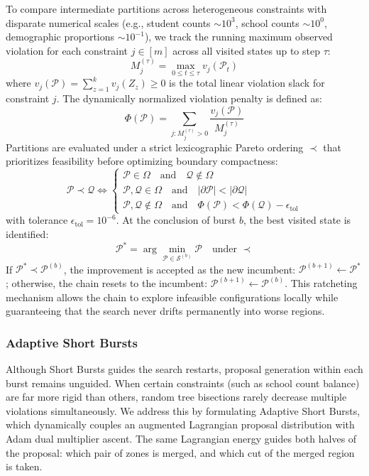 \documentclass{article}
\begin{document}
To compare intermediate partitions across heterogeneous constraints with disparate numerical scales (e.g., student counts $\sim 10^3$, school counts $\sim 10^0$, demographic proportions $\sim 10^{-1}$), we track the running maximum observed violation for each constraint $j \in [m]$ across all visited states up to step $\tau$:
\begin{equation}
M_j^{(\tau)} = \max_{0 \le t \le \tau} v_j(\mathcal{P}_t)
\end{equation}
where $v_j(\mathcal{P}) = \sum_{z=1}^k v_j(Z_z) \ge 0$ is the total linear violation slack for constraint $j$. The dynamically normalized violation penalty is defined as:
\begin{equation}
\Phi(\mathcal{P}) = \sum_{j: M_j^{(\tau)} > 0} \frac{v_j(\mathcal{P})}{M_j^{(\tau)}}
\end{equation}
Partitions are evaluated under a strict lexicographic Pareto ordering $\prec$ that prioritizes feasibility before optimizing boundary compactness:
\begin{equation}
\mathcal{P} \prec \mathcal{Q} \iff \begin{cases}
\mathcal{P} \in \Omega \quad \text{and} \quad \mathcal{Q} \notin \Omega \\
\mathcal{P}, \mathcal{Q} \in \Omega \quad \text{and} \quad |\partial \mathcal{P}| < |\partial \mathcal{Q}| \\
\mathcal{P}, \mathcal{Q} \notin \Omega \quad \text{and} \quad \Phi(\mathcal{P}) < \Phi(\mathcal{Q}) - \epsilon_{\text{tol}}
\end{cases}
\end{equation}
with tolerance $\epsilon_{\text{tol}} = 10^{-6}$. At the conclusion of burst $b$, the best visited state is identified:
\begin{equation}
\mathcal{P}^* = \arg\min_{\mathcal{P} \in \mathcal{S}^{(b)}} \mathcal{P} \quad \text{under } \prec
\end{equation}
If $\mathcal{P}^* \prec \mathcal{P}^{(b)}$, the improvement is accepted as the new incumbent: $\mathcal{P}^{(b+1)} \leftarrow \mathcal{P}^*$; otherwise, the chain resets to the incumbent: $\mathcal{P}^{(b+1)} \leftarrow \mathcal{P}^{(b)}$. This ratcheting mechanism allows the chain to explore infeasible configurations locally while guaranteeing that the search never drifts permanently into worse regions.

\subsubsection{Adaptive Short Bursts}\label{subsubsec:adaptive-short-bursts}
Although Short Bursts guides the search restarts, proposal generation within each burst remains unguided. When certain constraints (such as school count balance) are far more rigid than others, random tree bisections rarely decrease multiple violations simultaneously. We address this by formulating Adaptive Short Bursts, which dynamically couples an augmented Lagrangian proposal distribution with Adam dual multiplier ascent. The same Lagrangian energy guides both halves of the proposal: which pair of zones is merged, and which cut of the merged region is taken.
\end{document}
